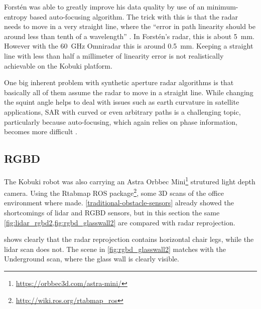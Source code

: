 Forstén was able to greatly improve his data quality by use of an minimum-entropy based auto-focusing algorithm. The trick with this is that the radar needs to move in a very straight line, where the ``error in path linearity should be around less than tenth of a wavelength'' \cite{Forsten2015}. In Forstén's radar, this is about \SI{5}{mm}. However with the \SI{60}{GHz} Omniradar this is around \SI{0.5}{mm}. Keeping a straight line with less than half a millimeter of linearity error is not realistically achievable on the Kobuki platform.

One big inherent problem with synthetic aperture radar algorithms is
that basically all of them assume the radar to move in a straight line.
While changing the squint angle helps to deal with issues such as earth
curvature in satellite applications, SAR with curved or even arbitrary
paths is a challenging topic, particularly because auto-focusing, which
again relies on phase information, becomes more difficult
\cite{Axelsson2002}.

\subsection{RGBD}\label{rgbd-1}
The Kobuki robot was also carrying an Astra Orbbec Mini\footnote{\url{https://orbbec3d.com/astra-mini/}} strutured light depth camera. Using the Rtabmap \cite{Labbe2014} ROS package\footnote{\url{http://wiki.ros.org/rtabmap_ros}}, some 3D scans of the office environment where made. \cref{traditional-obstacle-sensors} already showed the shortcomings of lidar and RGBD sensors, but in this section the same \cref{fig:lidar_rgbd2,fig:rgbd_glasswall2} are compared with radar reprojection.

 shows clearly that the radar reprojection contains horizontal chair legs, while the lidar scan does not. The scene in \cref{fig:rgbd_glasswall2} matches with the Underground scan, where the glass wall is clearly visible.

